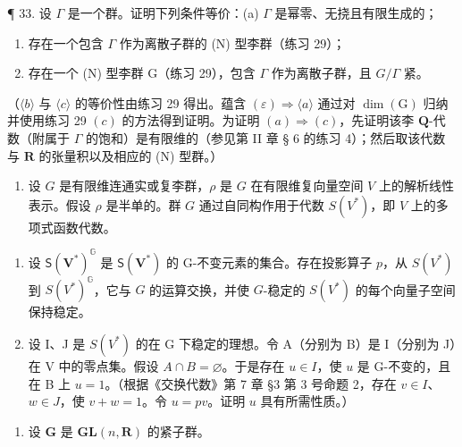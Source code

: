 ¶ 33. 设 \(\Gamma\) 是一个群。证明下列条件等价：(a) \(\Gamma\) 是幂零、无挠且有限生成的；

\begin{enumerate}
\def\labelenumi{(\alph{enumi})}
\setcounter{enumi}{1}
\item
  存在一个包含 \(\Gamma\) 作为离散子群的 (N) 型李群（练习 29）；
\item
  存在一个 (N) 型李群 G（练习 29），包含 \(\Gamma\) 作为离散子群，且 \(G / \Gamma\) 紧。
\end{enumerate}

（\(\langle b\rangle\) 与 \(\langle c\rangle\) 的等价性由练习 29 得出。蕴含 \((\varepsilon)\Rightarrow \langle a\rangle\) 通过对 \(\dim (\mathrm{G})\) 归纳并使用练习 29 \((c)\) 的方法得到证明。为证明 \((a)\Rightarrow (c)\)，先证明该李 \(\mathbf{Q}\)-代数（附属于 \(\Gamma\) 的饱和）是有限维的（参见第 II 章 § 6 的练习 4）；然后取该代数与 \(\mathbf{R}\) 的张量积以及相应的 (N) 型群。）

\begin{enumerate}
\def\labelenumi{\arabic{enumi}.}
\setcounter{enumi}{33}
\tightlist
\item
  设 \(G\) 是有限维连通实或复李群，\(\rho\) 是 \(G\) 在有限维复向量空间 \(V\) 上的解析线性表示。假设 \(\rho\) 是半单的。群 \(G\) 通过自同构作用于代数 \(S(V^*)\)，即 \(V\) 上的多项式函数代数。
\end{enumerate}

\begin{enumerate}
\def\labelenumi{(\alph{enumi})}
\item
  设 \(\mathsf{S}(\mathbf{V}^{*})^{\mathbb{G}}\) 是 \(\mathsf{S}(\mathbf{V}^{*})\) 的 G-不变元素的集合。存在投影算子 \(p\)，从 \(S(V^{*})\) 到 \(S(V^{*})^{\mathbb{G}}\)，它与 \(G\) 的运算交换，并使 \(G\)-稳定的 \(S(V^{*})\) 的每个向量子空间保持稳定。
\item
  设 I、J 是 \(S(V^*)\) 的在 G 下稳定的理想。令 A（分别为 B）是 I（分别为 J）在 V 中的零点集。假设 \(A \cap B = \varnothing\)。于是存在 \(u \in I\)，使 \(u\) 是 G-不变的，且在 B 上 \(u = 1\)。（根据《交换代数》第 7 章 §3 第 3 号命题 2，存在 \(v \in I\)、\(w \in J\)，使 \(v + w = 1\)。令 \(u = pv\)。证明 \(u\) 具有所需性质。）
\end{enumerate}

\begin{enumerate}
\def\labelenumi{\arabic{enumi}.}
\setcounter{enumi}{34}
\tightlist
\item
  设 \(\mathbf{G}\) 是 \(\mathbf{GL}(n,\mathbf{R})\) 的紧子群。
\end{enumerate}

